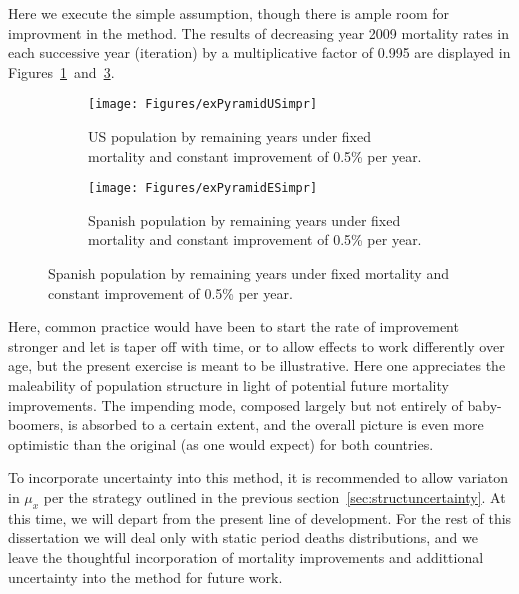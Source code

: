 Here we execute the simple assumption, though there is ample room for improvment
in the method. The results of decreasing year 2009 mortality rates in each
successive year (iteration) by a multiplicative factor of 0.995 are displayed in
Figures~\ref{fig:exPyrUSimpr}~and~\ref{fig:exPyrESimpr}.

\begin{figure}
        \centering
        \begin{subfigure}
                \centering
                \caption{US population by remaining years under fixed
                mortality and constant improvement of 0.5\% per year.}
                \texttt{[image: Figures/exPyramidUSimpr]}
                \label{fig:exPyrUSimpr}
        \end{subfigure}
        \begin{subfigure}
                \centering
                \caption{Spanish population by remaining years under fixed
                mortality and constant improvement of 0.5\% per year.}
                \texttt{[image: Figures/exPyramidESimpr]}
                \label{fig:exPyrESimpr}
        \end{subfigure}
\end{figure}

Here, common practice would have been to start the rate of improvement stronger
and let is taper off with time, or to allow effects to work differently over
age, but the present exercise is meant to be illustrative. Here one appreciates
the maleability of population structure in light of potential future mortality
improvements. The impending mode, composed largely but not entirely of
baby-boomers, is absorbed to a certain extent, and the overall picture is even
more optimistic than the original (as one would expect) for both countries.

To incorporate uncertainty into this method, it is
recommended to allow variaton in $\mu_x$ per the strategy outlined in the previous
section~\ref{sec:structuncertainty}. At this time, we will depart from the
present line of development. For the rest of this dissertation we will deal only with static
period deaths distributions, and we leave the thoughtful incorporation of mortality 
improvements and addittional uncertainty into the method for future work.

\FloatBarrier